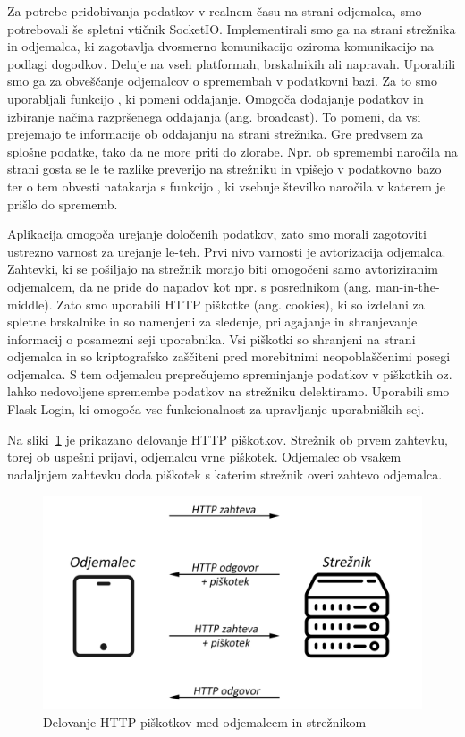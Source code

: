 \documentclass[a4paper, 12pt]{book}
\begin{document}
Za potrebe pridobivanja podatkov v realnem času na strani odjemalca, smo potrebovali še spletni vtičnik SocketIO. Implementirali smo ga na strani strežnika in odjemalca, ki zagotavlja dvosmerno komunikacijo oziroma komunikacijo na podlagi dogodkov. Deluje na vseh platformah, brskalnikih ali napravah. Uporabili smo ga za obveščanje odjemalcov o spremembah v podatkovni bazi. Za to smo uporabljali funkcijo , ki pomeni oddajanje. Omogoča dodajanje podatkov in izbiranje načina razpršenega oddajanja (ang. broadcast). To pomeni, da vsi prejemajo te informacije ob oddajanju na strani strežnika. Gre predvsem za splošne podatke, tako da ne more priti do zlorabe. Npr. ob spremembi naročila na strani gosta se le te razlike preverijo na strežniku in vpišejo v podatkovno bazo ter o tem obvesti natakarja s funkcijo , ki vsebuje številko naročila v katerem je prišlo do sprememb. 
	

Aplikacija omogoča urejanje določenih podatkov, zato smo morali zagotoviti ustrezno varnost za urejanje le-teh. Prvi nivo varnosti je avtorizacija odjemalca. Zahtevki, ki se pošiljajo na strežnik morajo biti omogočeni samo avtoriziranim odjemalcem, da ne pride do napadov kot npr. s posrednikom (ang. man-in-the-middle). Zato smo uporabili HTTP piškotke (ang. cookies), ki so izdelani za spletne brskalnike in so namenjeni za sledenje, prilagajanje in shranjevanje informacij o posamezni seji uporabnika. Vsi piškotki so shranjeni na strani odjemalca in so kriptografsko zaščiteni pred morebitnimi neopoblaščenimi posegi odjemalca. S tem odjemalcu preprečujemo spreminjanje podatkov v piškotkih oz. lahko nedovoljene spremembe podatkov na strežniku delektiramo. Uporabili smo Flask-Login, ki omogoča vse funkcionalnost za upravljanje uporabniških sej. 

Na sliki~\ref{Cookies} je prikazano delovanje HTTP piškotkov. Strežnik ob prvem zahtevku, torej ob uspešni prijavi, odjemalcu vrne piškotek. Odjemalec ob vsakem nadaljnjem zahtevku doda piškotek s katerim strežnik overi zahtevo odjemalca.

\begin{figure}[!htb]
\begin{center}
\includegraphics[width=14cm]{cookie-how1.png}
\end{center}
\caption{Delovanje HTTP piškotkov med odjemalcem in strežnikom}
\label{Cookies}
\end{figure}
\end{document}
